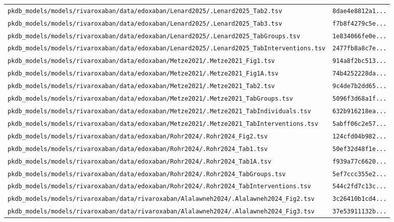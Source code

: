 \documentclass{article}
\begin{document}
\begin{longtable}{ll}
\texttt{pkdb\_models/models/rivaroxaban/data/edoxaban/Lenard2025/.Lenard2025\_Tab2.tsv} & \texttt{8dae4e8812a1...} \\
\texttt{pkdb\_models/models/rivaroxaban/data/edoxaban/Lenard2025/.Lenard2025\_Tab3.tsv} & \texttt{f7b8f4279c5e...} \\
\texttt{pkdb\_models/models/rivaroxaban/data/edoxaban/Lenard2025/.Lenard2025\_TabGroups.tsv} & \texttt{1e834066fe0e...} \\
\texttt{pkdb\_models/models/rivaroxaban/data/edoxaban/Lenard2025/.Lenard2025\_TabInterventions.tsv} & \texttt{2477fb8a8c7e...} \\
\texttt{pkdb\_models/models/rivaroxaban/data/edoxaban/Metze2021/.Metze2021\_Fig1.tsv} & \texttt{914a8f2bc513...} \\
\texttt{pkdb\_models/models/rivaroxaban/data/edoxaban/Metze2021/.Metze2021\_Fig1A.tsv} & \texttt{74b4252228da...} \\
\texttt{pkdb\_models/models/rivaroxaban/data/edoxaban/Metze2021/.Metze2021\_Tab2.tsv} & \texttt{9c4de7b2dd65...} \\
\texttt{pkdb\_models/models/rivaroxaban/data/edoxaban/Metze2021/.Metze2021\_TabGroups.tsv} & \texttt{5096f3d68a1f...} \\
\texttt{pkdb\_models/models/rivaroxaban/data/edoxaban/Metze2021/.Metze2021\_TabIndividuals.tsv} & \texttt{632b916218ea...} \\
\texttt{pkdb\_models/models/rivaroxaban/data/edoxaban/Metze2021/.Metze2021\_TabInterventions.tsv} & \texttt{5abff06c2e57...} \\
\texttt{pkdb\_models/models/rivaroxaban/data/edoxaban/Rohr2024/.Rohr2024\_Fig2.tsv} & \texttt{124cfd04b982...} \\
\texttt{pkdb\_models/models/rivaroxaban/data/edoxaban/Rohr2024/.Rohr2024\_Tab1.tsv} & \texttt{50ef32d48f1e...} \\
\texttt{pkdb\_models/models/rivaroxaban/data/edoxaban/Rohr2024/.Rohr2024\_Tab1A.tsv} & \texttt{f939a77c6620...} \\
\texttt{pkdb\_models/models/rivaroxaban/data/edoxaban/Rohr2024/.Rohr2024\_TabGroups.tsv} & \texttt{5ef7ccc355e2...} \\
\texttt{pkdb\_models/models/rivaroxaban/data/edoxaban/Rohr2024/.Rohr2024\_TabInterventions.tsv} & \texttt{544c2fd7c13c...} \\
\texttt{pkdb\_models/models/rivaroxaban/data/rivaroxaban/Alalawneh2024/.Alalawneh2024\_Fig2.tsv} & \texttt{3c26410b1cd4...} \\
\texttt{pkdb\_models/models/rivaroxaban/data/rivaroxaban/Alalawneh2024/.Alalawneh2024\_Fig3.tsv} & \texttt{37e53911132b...} \\

\end{longtable}
\end{document}
